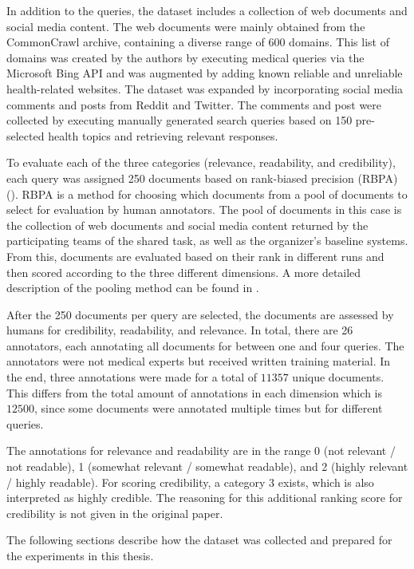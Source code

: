 In addition to the queries, the dataset includes a collection of web documents and social media content.
The web documents were mainly obtained from the CommonCrawl archive, containing a diverse range of 600 domains.
This list of domains was created by the authors by executing medical queries via the Microsoft Bing API and was augmented by adding known reliable and unreliable health-related websites.
The dataset was expanded by incorporating social media comments and posts from Reddit and Twitter.
The comments and post were collected by executing manually generated search queries based on 150 pre-selected health topics and retrieving relevant responses.

To evaluate each of the three categories (relevance, readability, and credibility), each query was assigned 250 documents based on rank-biased precision (RBPA) (\cite{moffat:2008:Rank}).
RBPA is a method for choosing which documents from a pool of documents to select for evaluation by human annotators.
The pool of documents in this case is the collection of web documents and social media content returned by the participating teams of the shared task, as well as the organizer's baseline systems.
From this, documents are evaluated based on their rank in different runs and then scored according to the three different dimensions.
A more detailed description of the pooling method can be found in \cite{lipani:2017:Fixed}.

After the 250 documents per query are selected, the documents are assessed by humans for credibility, readability, and relevance.
In total, there are 26 annotators, each annotating all documents for between one and four queries.
The annotators were not medical experts but received written training material.
In the end, three annotations were made for a total of $11 357$ unique documents.
This differs from the total amount of annotations in each dimension which is $12 500$, since some documents were annotated multiple times but for different queries.

The annotations for relevance and readability are in the range 0 (not relevant / not readable), 1 (somewhat relevant / somewhat readable), and 2 (highly relevant / highly readable).
For scoring credibility, a category 3 exists, which is also interpreted as highly credible.
The reasoning for this additional ranking score for credibility is not given in the original paper.

The following sections describe how the dataset was collected and prepared for the experiments in this thesis.
